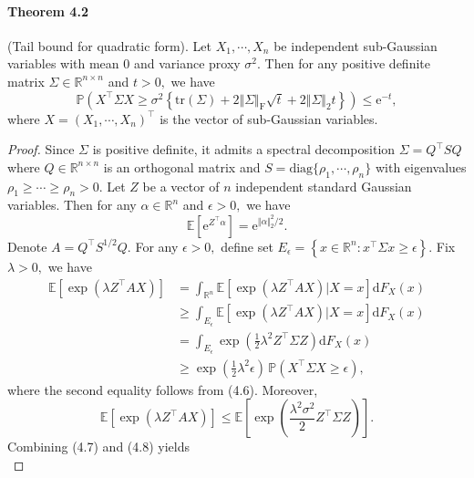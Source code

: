 \documentclass{article}
\newcommand{\E}{\mathbb{E}}
\begin{document}
\paragraph{Theorem 4.2} (Tail bound for quadratic form). Let $X_1,\cdots,X_n$ be independent sub-Gaussian variables with mean 0 and variance proxy $\sigma^2.$ Then for any positive definite matrix $\Sigma\in\mathbb{R}^{n\times n}$ and $t > 0,$ we have
\begin{equation*}
	\mathbb{P}\left(X^\top\Sigma X\geq \sigma^2\left\{\mathrm{tr}(\Sigma) + 2\Vert\Sigma\Vert_\mathrm{F}\sqrt{t} + 2\Vert\Sigma\Vert_2t\right\}\right)\leq\mathrm{e}^{-t},\tag{4.5}
\end{equation*}
where $X=(X_1,\cdots,X_n)^\top$ is the vector of sub-Gaussian variables.
\begin{proof}
Since $\Sigma$ is positive definite, it admits a spectral decomposition $\Sigma=Q^\top SQ$ where $Q\in\mathbb{R}^{n\times n}$ is an orthogonal matrix and $S=\mathrm{diag}\{\rho_1,\cdots,\rho_n\}$ with eigenvalues $\rho_1 \geq\cdots\geq \rho_n > 0.$ Let $Z$ be a vector of $n$ independent standard Gaussian variables. Then for any $\alpha\in\mathbb{R}^n$ and $\epsilon >0,$ we have
\begin{equation*}
	\E\left[\mathrm{e}^{Z^\top\alpha}\right] = \mathrm{e}^{{\Vert\alpha\Vert_2^2}/{2}}.\tag{4.6}
\end{equation*}
Denote $A=Q^\top S^{1/2}Q.$ For any $\epsilon > 0,$ define set $E_\epsilon=\left\{x\in\mathbb{R}^n:x^\top\Sigma x \geq \epsilon\right\}.$ Fix $\lambda > 0,$ we have
\begin{align*}
	\E\left[\exp\left(\lambda Z^\top AX\right)\right] &= \int_{\mathbb{R}^n}\E\left[\exp\left(\lambda Z^\top AX\right)|X=x\right]\mathrm{d}F_X(x)\\
	&\geq \int_{E_\epsilon}\E\left[\exp\left(\lambda Z^\top AX\right)|X=x\right]\mathrm{d}F_X(x)\\
	&= \int_{E_\epsilon}\exp\left(\frac{1}{2}\lambda^2Z^\top\Sigma Z\right)\mathrm{d}F_X(x)\\
	&\geq \exp\left(\frac{1}{2}\lambda^2\epsilon\right)\,\mathbb{P}(X^\top\Sigma X\geq \epsilon),\tag{4.7}
\end{align*}
where the second equality follows from (4.6). Moreover,
\begin{equation*}
	\E\left[\exp\left(\lambda Z^\top AX\right)\right]\leq \E\left[\exp\left(\frac{\lambda^2\sigma^2}{2}Z^\top\Sigma Z\right)\right].\tag{4.8}
\end{equation*}
Combining (4.7) and (4.8) yields
\begin{equation*}

\end{equation*}
\end{proof}
\end{document}
